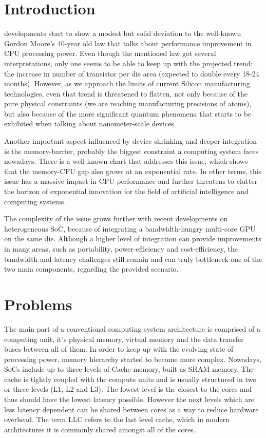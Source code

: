 \documentclass[journal]{IEEEtran}
\begin{document}
\section{Introduction}
\indent {} developments start to show a modest but solid deviation to the well-known Gordon Moore's 40-year old law that talks about performance improvement in CPU processing power. Even though the mentioned law got several interpretations, only one seems to be able to keep up with the projected trend: the increase in number of transistor per die area (expected to double every 18-24 months). However, as we approach the limits of current Silicon manufacturing technologies, even that trend is threatened to flatten, not only because of the pure physical constraints (we are reaching manufacturing precisions of atoms), but also because of the more significant quantum phenomena that starts to be exhibited when talking about nanometer-scale devices.

Another important aspect influenced by device shrinking and deeper integration is the memory-barrier, probably the biggest constraint a computing system faces nowadays. There is a well known chart that addresses this issue, which shows that the memory-CPU gap also grows at an exponential rate. In other terms, this issue has a massive impact in CPU performance and further threatens to clutter the horizon of exponential innovation for the field of artificial intelligence and computing systems.

The complexity of the issue grows further with recent developments on heterogeneous SoC, because of integrating a bandwidth-hungry multi-core GPU on the same die. Although a higher level of integration can provide improvements in many areas, such as portability, power-efficiency and cost-efficiency, the bandwidth and latency challenges still remain and can truly bottleneck one of the two main components, regarding the provided scenario.

\section{Problems}
The main part of a conventional computing system architecture is comprised of a computing unit, it's physical memory, virtual memory and the data transfer buses between all of them. In order to keep up with the evolving state of processing power, memory hierarchy started to become more complex. Nowadays, SoCs include up to three levels of Cache memory, built as SRAM memory. The cache is tightly coupled with the compute units and is usually structured in two or three levels (L1, L2 and L3). The lowest level is the closest to the cores and thus should have the lowest latency possible. However the next levels which are less latency dependent can be shared between cores as a way to reduce hardware overhead. The term LLC refers to the last level cache, which in modern architectures it is commonly shared amongst all of the cores.
\end{document}
